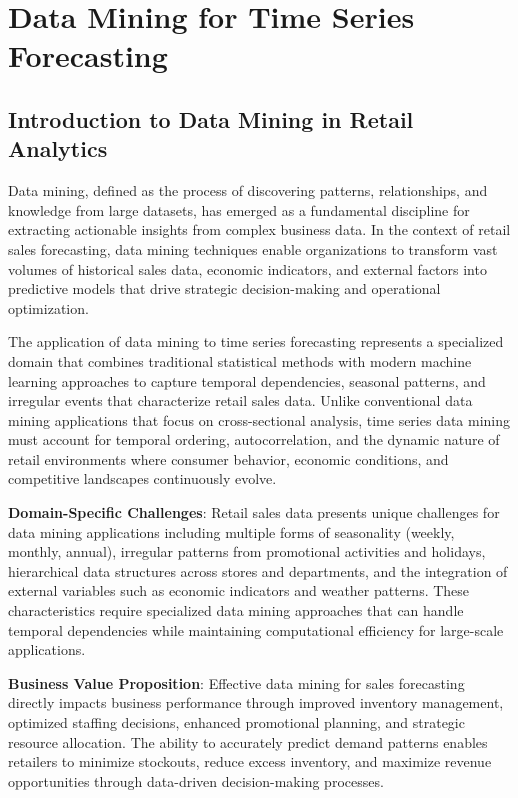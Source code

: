 %
%
%


\chapter{Data Mining for Time Series Forecasting}

\section{Introduction to Data Mining in Retail Analytics}

Data mining, defined as the process of discovering patterns, relationships, and knowledge from large datasets, has emerged as a fundamental discipline for extracting actionable insights from complex business data. In the context of retail sales forecasting, data mining techniques enable organizations to transform vast volumes of historical sales data, economic indicators, and external factors into predictive models that drive strategic decision-making and operational optimization.

The application of data mining to time series forecasting represents a specialized domain that combines traditional statistical methods with modern machine learning approaches to capture temporal dependencies, seasonal patterns, and irregular events that characterize retail sales data. Unlike conventional data mining applications that focus on cross-sectional analysis, time series data mining must account for temporal ordering, autocorrelation, and the dynamic nature of retail environments where consumer behavior, economic conditions, and competitive landscapes continuously evolve.

\textbf{Domain-Specific Challenges}: Retail sales data presents unique challenges for data mining applications including multiple forms of seasonality (weekly, monthly, annual), irregular patterns from promotional activities and holidays, hierarchical data structures across stores and departments, and the integration of external variables such as economic indicators and weather patterns. These characteristics require specialized data mining approaches that can handle temporal dependencies while maintaining computational efficiency for large-scale applications.

\textbf{Business Value Proposition}: Effective data mining for sales forecasting directly impacts business performance through improved inventory management, optimized staffing decisions, enhanced promotional planning, and strategic resource allocation. The ability to accurately predict demand patterns enables retailers to minimize stockouts, reduce excess inventory, and maximize revenue opportunities through data-driven decision-making processes.

